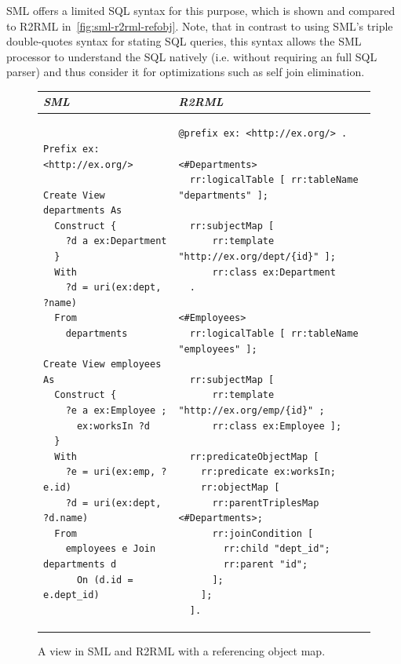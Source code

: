 SML offers a limited SQL syntax for this purpose, which is shown and compared to
R2RML in~\autoref{fig:sml-r2rml-refobj}. Note, that in contrast to using SML's
triple double-quotes syntax for stating SQL queries, this
syntax allows the SML processor to understand the SQL natively (i.e.
without requiring an full SQL parser) and thus consider it for optimizations
such as self join elimination.

\begin{figure}[tb]
\centering
\begin{tabular}{@{}ll@{}}
\toprule
\emph{SML} & \emph{R2RML}  \\
\midrule

  \begin{minipage}{0.38\linewidth}
    \begin{scriptsize}
\begin{verbatim}
Prefix ex: <http://ex.org/>

Create View departments As
  Construct {
    ?d a ex:Department
  }
  With
    ?d = uri(ex:dept, ?name)
  From
    departments

Create View employees As
  Construct {
    ?e a ex:Employee ;
      ex:worksIn ?d
  }
  With
    ?e = uri(ex:emp, ?e.id)
    ?d = uri(ex:dept, ?d.name)
  From
    employees e Join departments d
      On (d.id = e.dept_id)
\end{verbatim}
    \end{scriptsize}
  \end{minipage}

&
  \begin{minipage}{0.60\linewidth}
    \begin{scriptsize}
\begin{verbatim}
@prefix ex: <http://ex.org/> .

<#Departments>
  rr:logicalTable [ rr:tableName "departments" ];

  rr:subjectMap [
      rr:template "http://ex.org/dept/{id}" ];
      rr:class ex:Department
  .

<#Employees>
  rr:logicalTable [ rr:tableName "employees" ];

  rr:subjectMap [
      rr:template "http://ex.org/emp/{id}" ;
      rr:class ex:Employee ];

  rr:predicateObjectMap [
    rr:predicate ex:worksIn;
    rr:objectMap [
      rr:parentTriplesMap <#Departments>;
      rr:joinCondition [
        rr:child "dept_id";
        rr:parent "id";
      ];
    ];
  ].
\end{verbatim}
    \end{scriptsize}
  \end{minipage}
\\
\bottomrule
\end{tabular}
\caption{A view in SML and R2RML with a referencing object map.}
\label{fig:sml-r2rml-refobj}
\end{figure}

